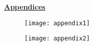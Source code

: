 \clearpage
\newpage
\textbf{\underline{Appendices}}
\begin{figure}[H] %
\centering
\texttt{[image: appendix1]}
\label{fig:appendix1}
\end{figure}	

\begin{figure}[H] %
\centering
\texttt{[image: appendix2]}
\label{fig:appendix2}
\end{figure}

